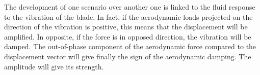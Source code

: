 The development of one scenario over another one is linked to
the fluid response to the vibration of the blade. In fact,
if the aerodynamic loads projected on the direction of the vibration
is positive, this means that the displacement will be amplified. 
In opposite, if the force is in opposed direction, the vibration will be damped.
The out-of-phase component of the aerodynamic force compared to
the displacement vector will give finally the sign of the aerodynamic damping.
The amplitude will give its strength. 
